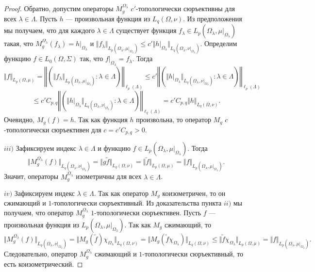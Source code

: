 \begin{proof}
Обратно, допустим операторы $M_g^{\Omega_\lambda}$ $c'$-топологически сюръективны для всех $\lambda\in\Lambda$. Пусть $h$ --- произвольная функция из $L_q(\Omega,\nu)$. Из предположения мы получаем, что для каждого $\lambda\in\Lambda$ существует функция $f_\lambda\in L_p(\Omega_\lambda,\mu|_{\Omega_\lambda})$ такая, что $M_g^{\Omega_\lambda}(f_\lambda)=h|_{\Omega_\lambda}$ и $\Vert f_\lambda\Vert_{L_p(\Omega_\lambda,\mu|_{\Omega_\lambda})}\leq c'\Vert h|_{\Omega_\lambda}\Vert_{L_q(\Omega_\lambda,\nu|_{\Omega_\lambda})}$. Определим функцию $f\in L_0(\Omega,\Sigma)$ так, что $f|_{\Omega_\lambda}=f_\lambda$. Тогда
$$
\Vert f\Vert_{L_p(\Omega,\mu)}
=\left\Vert\left(\Vert f_\lambda\Vert_{L_p(\Omega_\lambda,\mu|_{\Omega_\lambda})}:\lambda\in\Lambda\right)\right\Vert_{\ell_p(\Lambda)}
\leq c'\left\Vert\left(\Vert h|_{\Omega_\lambda}\Vert_{L_q(\Omega_\lambda,\nu|_{\Omega_\lambda})}:\lambda\in\Lambda\right)\right\Vert_{\ell_p(\Lambda)}
$$
$$
\leq c'C_{p,q}\left\Vert\left(\Vert h|_{\Omega_\lambda}\Vert_{L_q(\Omega_\lambda,\nu|_{\Omega_\lambda})}:\lambda\in\Lambda\right)\right\Vert_{\ell_q(\Lambda)}
=c'C_{p,q}\Vert h\Vert_{L_q(\Omega,\nu)}.
$$
Очевидно, $M_g(f)=h$. Так как функция $h$ произвольна, то оператор $M_g$ $c$-топологически сюръективен для $c=c'C_{p,q}>0$.

$iii)$ Зафиксируем индекс $\lambda\in\Lambda$ и функцию $f\in L_p(\Omega_\lambda,\mu|_{\Omega_\lambda})$. Тогда 
$$
\Vert M_g^{\Omega_\lambda}(f)\Vert_{L_q(\Omega_\lambda,\nu|_{\Omega_\lambda})}
=\Vert g \widetilde{f}\Vert_{L_q(\Omega,\nu)}
=\Vert\widetilde{f}\Vert_{L_p(\Omega,\mu)}
=\Vert f\Vert_{L_p(\Omega_\lambda,\mu|_{\Omega_\lambda})}.
$$
Значит, операторы $M_g^{\Omega_\lambda}$ изометричны для всех $\lambda\in\Lambda$.

$iv)$ Зафиксируем индекс $\lambda\in\Lambda$. Так как оператор $M_g$ коизометричен, то он сжимающий и $1$-топологически сюръективный. Из доказательства пункта $ii)$ мы получаем, что оператор $M_g^{\Omega_\lambda}$ $1$-топологически сюръективен. Пусть $f$ --- произвольная функция из $ L_p(\Omega_\lambda,\mu|_{\Omega_\lambda})$. Так как $M_g$ сжимающий, то
$$
\Vert M_g^{\Omega_\lambda}(f)\Vert_{L_q(\Omega_\lambda,\nu|_{\Omega_\lambda})}
=\Vert M_g(\widetilde{f})\chi_{\Omega_\lambda}\Vert_{L_q(\Omega,\nu)}
=\Vert M_g(\widetilde{f}\chi_{\Omega_\lambda})\Vert_{L_q(\Omega,\nu)}
\leq \Vert\widetilde{f}\chi_{\Omega_\lambda}\Vert_{L_p(\Omega,\mu)}
=\Vert f\Vert_{L_p(\Omega_{\lambda},\mu|_{\Omega_\lambda})}.
$$
Следовательно, оператор $M_g^{\Omega_\lambda}$ сжимающий и $1$-топологически сюръективный, то есть коизометрический.
\end{proof}

